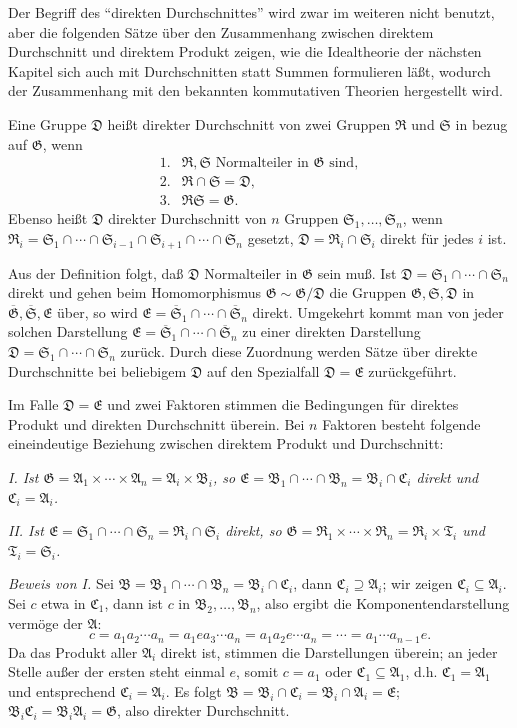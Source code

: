 \documentclass[11pt]{article}
\providecommand{\mG}{\mathfrak{G}}
\providecommand{\mA}{\mathfrak{A}}
\providecommand{\mB}{\mathfrak{B}}
\providecommand{\mC}{\mathfrak{C}}
\providecommand{\mD}{\mathfrak{D}}
\providecommand{\mE}{\mathfrak{E}}
\providecommand{\mR}{\mathfrak{R}}
\providecommand{\mS}{\mathfrak{S}}
\providecommand{\mT}{\mathfrak{T}}
\begin{document}
Der Begriff des ``direkten Durchschnittes'' wird zwar im weiteren nicht benutzt, aber die folgenden Sätze über den Zusammenhang zwischen direktem Durchschnitt und direktem Produkt zeigen, wie die Idealtheorie der nächsten Kapitel sich auch mit Durchschnitten statt Summen formulieren läßt, wodurch der Zusammenhang mit den bekannten kommutativen Theorien hergestellt wird.

Eine Gruppe $\mD$ heißt direkter Durchschnitt von zwei Gruppen $\mR$ und $\mS$ in bezug auf $\mG$, wenn
\[
\begin{array}{ll}
1.& \mR,\mS\text{ Normalteiler in }\mG\text{ sind},\\
2.& \mR\cap\mS=\mD,\\
3.& \mR\mS=\mG.
\end{array}
\]
Ebenso heißt $\mD$ direkter Durchschnitt von $n$ Gruppen $\mS_1,\ldots,\mS_n$, wenn $\mR_i=\mS_1\cap\cdots\cap\mS_{i-1}\cap\mS_{i+1}\cap\cdots\cap\mS_n$ gesetzt, $\mD=\mR_i\cap\mS_i$ direkt für jedes $i$ ist.

Aus der Definition folgt, daß $\mD$ Normalteiler in $\mG$ sein muß. Ist $\mD=\mS_1\cap\cdots\cap\mS_n$ direkt und gehen beim Homomorphismus $\mG\sim\mG/\mD$ die Gruppen $\mG,\mS,\mD$ in $\overline{\mG},\overline{\mS},\mE$ über, so wird $\mE=\overline{\mS}_1\cap\cdots\cap\overline{\mS}_n$ direkt. Umgekehrt kommt man von jeder solchen Darstellung $\mE=\overline{\mS}_1\cap\cdots\cap\overline{\mS}_n$ zu einer direkten Darstellung $\mD=\mS_1\cap\cdots\cap\mS_n$ zurück. Durch diese Zuordnung werden Sätze über direkte Durchschnitte bei beliebigem $\mD$ auf den Spezialfall $\mD=\mE$ zurückgeführt.

Im Falle $\mD=\mE$ und zwei Faktoren stimmen die Bedingungen für direktes Produkt und direkten Durchschnitt überein. Bei $n$ Faktoren besteht folgende eineindeutige Beziehung zwischen direktem Produkt und Durchschnitt:

\emph{I. Ist $\mG=\mA_1\times\cdots\times\mA_n=\mA_i\times\mB_i$, so $\mE=\mB_1\cap\cdots\cap\mB_n=\mB_i\cap\mC_i$ direkt und $\mC_i=\mA_i$.}

\emph{II. Ist $\mE=\mS_1\cap\cdots\cap\mS_n=\mR_i\cap\mS_i$ direkt, so $\mG=\mR_1\times\cdots\times\mR_n=\mR_i\times\mT_i$ und $\mT_i=\mS_i$.}

\emph{Beweis von I.} Sei $\mB=\mB_1\cap\cdots\cap\mB_n=\mB_i\cap\mC_i$, dann $\mC_i\supseteq\mA_i$; wir zeigen $\mC_i\subseteq\mA_i$. Sei $c$ etwa in $\mC_1$, dann ist $c$ in $\mB_2,\ldots,\mB_n$, also ergibt die Komponentendarstellung vermöge der $\mA$:
\[
        c=a_1a_2\cdots a_n=a_1ea_3\cdots a_n=a_1a_2e\cdots a_n=\cdots=a_1\cdots a_{n-1}e.
\]
Da das Produkt aller $\mA_i$ direkt ist, stimmen die Darstellungen überein; an jeder Stelle außer der ersten steht einmal $e$, somit $c=a_1$ oder $\mC_1\subseteq\mA_1$, d.h. $\mC_1=\mA_1$ und entsprechend $\mC_i=\mA_i$. Es folgt $\mB=\mB_i\cap\mC_i=\mB_i\cap\mA_i=\mE$; $\mB_i\mC_i=\mB_i\mA_i=\mG$, also direkter Durchschnitt.
\end{document}
